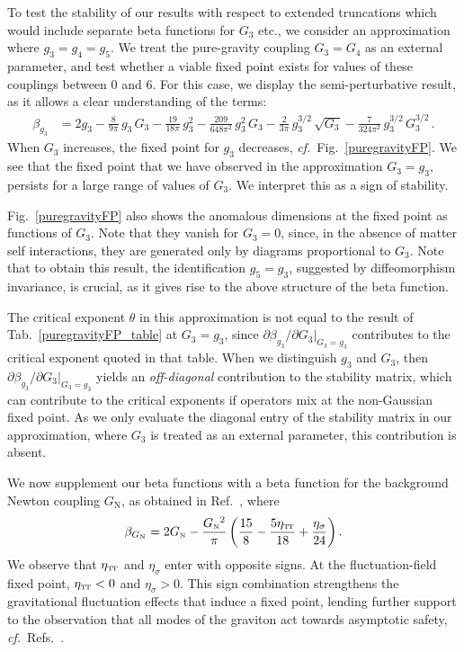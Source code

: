 \documentclass[11pt]{book}
\newcommand\TTspace{ -1pt }
\newcommand\etaTT{ \eta_{\scriptscriptstyle{\mathrm{T\hspace{\TTspace}T}}} }
\newcommand\GNewton{ G_{\scriptscriptstyle{\mathrm{N}}}{} }
\newcommand\Gback{ \GNewton } %
\newcommand\cf{\textit{cf.}\ }
\numberwithin{equation}{chapter}
\begin{document}
To test the stability of our results with respect to extended truncations which would include separate
beta functions for $G_3$ etc.,
we consider an approximation where $g_3=g_4=g_5$.
We treat the pure-gravity coupling $G_3=G_4$ as an external parameter,
and test whether a viable fixed point exists for values of these couplings between 0 and 6.
For this case, we display the semi-perturbative result, as it allows a clear understanding of the terms:
\begin{align}
  \beta_{g_3} &= 2 g_3
  - \frac{8}{9 \pi}       \, g_3       \, G_3
  - \frac{19}{18 \pi}     \, g_3^2
  - \frac{209}{648 \pi^2} \, g_3^2     \, G_3
  - \frac{2}{3 \pi}       \, g_3^{3/2} \, \sqrt{G_3}
  - \frac{7}{324 \pi^2}   \, g_3^{3/2} \, G_3^{3/2} \,.
\end{align}
When $G_3$ increases, the fixed point for $g_3$ decreases, \cf Fig.~\ref{puregravityFP}.
We see that the fixed point that we have observed in the approximation $G_3=g_3$,
persists for a large range of values of $G_3$.
We interpret this as a sign of stability.

Fig.~\ref{puregravityFP} also shows the anomalous dimensions at the fixed point as functions of $G_3$.
Note that they vanish for $G_3=0$, since, in the absence of matter self interactions, they are
generated only by diagrams proportional to $G_3$.
Note that to obtain this result, the identification $g_5=g_3$,
suggested by diffeomorphism invariance, is crucial,
as it gives rise to the above structure of the beta function.

The critical exponent $\theta$ in this approximation is not equal to the result of
Tab.~\ref{puregravityFP_table} at $G_3=g_3$,
since $\partial \beta_{g_3}/\partial G_3 \vert_{G_3=g_3}$ contributes to the critical
exponent quoted in that table. When we distinguish $g_3$ and $G_3$,
then  $\partial \beta_{g_3}/\partial G_3 \vert_{G_3=g_3}$ yields an \emph{off-diagonal} contribution
to the stability matrix, which can contribute to the critical exponents if operators mix
at the non-Gaussian fixed point. As we only evaluate the diagonal entry of the stability
matrix in our approximation, where $G_3$ is treated as an external parameter, this contribution is absent.

We now supplement our beta functions with a beta function for the background Newton coupling $\Gback$,
as obtained in Ref.~\cite{Percacci:2015wwa}, where
\begin{align}
  \beta_{\Gback} = 2 \Gback - \frac{\Gback^2}{\pi}
  \left(
    \frac{15}{8} - \frac{5 \etaTT}{18 } + \frac{\eta_{\sigma}}{24}
  \right).
\end{align}
We observe that $\etaTT$ and $\eta_{\sigma}$ enter with opposite signs.
At the fluctuation-field fixed point, $\etaTT<0$  and $\eta_{\sigma}>0$.
This sign combination strengthens the gravitational fluctuation effects that induce a fixed point,
lending further support to the observation that all modes of the graviton act towards asymptotic
safety, \cf Refs.~\cite{Reuter:2008qx, Reuter:2008wj}.
\end{document}
